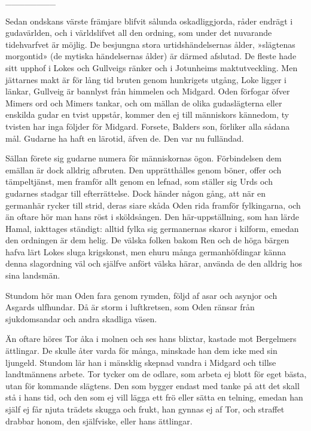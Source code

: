{\_\_\_\_\_\_\_\_}

Sedan ondskans värste främjare blifvit sålunda oskadliggjorda, råder
endrägt i gudavärlden, och i världslifvet all den ordning, som under det
nuvarande tidehvarfvet är möjlig. De besjungna stora urtidshändelsernas
ålder, »slägtenas morgontid» (de mytiska händelsernas ålder) är därmed
afslutad. De fleste hade sitt upphof i Lokes och Gullveigs ränker och i
Jotunheims maktutveckling. Men jättarnes makt är för lång tid bruten
genom hunkrigets utgång, Loke ligger i länkar, Gullveig är bannlyst från
himmelen och Midgard. Oden förfogar öfver Mimers ord och Mimers tankar,
och om mällan de olika gudaslägterna eller enskilda gudar en tvist
uppstår, kommer den ej till människors kännedom, ty tvisten har inga
följder för Midgard. Forsete, Balders son, förliker alla sådana mål.
Gudarne ha haft en lärotid, äfven de. Den var nu fulländad.

Sällan förete sig gudarne numera för människornas ögon. Förbindelsen dem
emällan är dock alldrig afbruten. Den
\protect\hypertarget{lb1625905.xhtmlux5cux23start176}{}{}\protect\hypertarget{lb1625905.xhtmlux5cux23start176-a}{}{}\protect\hypertarget{lb1625905.xhtmlux5cux23start176-b}{}{}\protect\hypertarget{lb1625905.xhtmlux5cux23start176-c}{}{}\protect\hypertarget{lb1625905.xhtmlux5cux23start176-d}{}{}
upprätthålles genom böner, offer och tämpeltjänst, men framför allt
genom en lefnad, som ställer sig Urds och gudarnes stadgar till
efterrättelse. Dock händer någon gång, att när en germanhär rycker till
strid, deras siare skåda Oden rida framför fylkingarna, och än oftare
hör man hans röst i sköldsången. Den här-uppställning, som han lärde
Hamal, iakttages ständigt: alltid fylka sig germanernas skaror i
kilform, emedan den ordningen är dem helig. De välska folken bakom Ren
och de höga bärgen hafva lärt Lokes sluga krigskonst, men ehuru många
germanhöfdingar känna denna slagordning väl och själfve anfört välska
härar, använda de den alldrig hos sina landsmän.

Stundom hör man Oden fara genom rymden, följd af asar och asynjor och
Asgards ulfhundar. Då är storm i luftkretsen, som Oden ränsar från
sjukdomsandar och andra skadliga väsen.

Än oftare höres Tor åka i molnen och ses hans blixtar, kastade mot
Bergelmers ättlingar. De skulle åter varda för många, minskade han dem
icke med sin ljungeld. Stundom lär han i mänsklig skepnad vandra i
Midgard och tillse landtmännens arbete. Tor tycker om de odlare, som
arbeta ej blott för eget bästa, utan för kommande slägtens. Den som
bygger endast med tanke på att det skall stå i hans tid, och den som ej
vill lägga ett frö eller sätta en telning, emedan han själf ej får njuta
trädets skugga och frukt, han gynnas ej af Tor, och straffet drabbar
honom, den själfviske, eller hans ättlingar.

